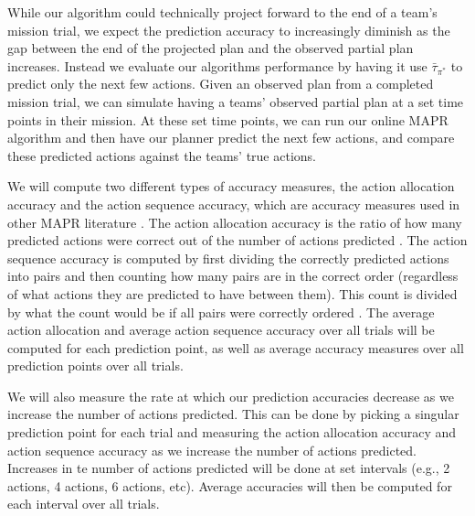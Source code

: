 While our algorithm could technically project forward to the end of a team's mission trial, we expect the prediction accuracy to increasingly diminish as the gap between the end of the projected plan and the observed partial plan increases. Instead we evaluate our algorithms performance by having it use $\bar{\tau}_{\pi^*}$ to predict only the next few actions. Given an observed plan from a completed mission trial, we can simulate having a teams' observed partial plan at a set time points in their mission. At these set time points, we can run our online MAPR algorithm and then have our planner predict the next few actions, and compare these predicted actions against the teams' true actions. 

We will compute two different types of accuracy measures, the action allocation accuracy and the action sequence accuracy, which are accuracy measures used in other MAPR literature \citep{Kim_Chacha_Shah_2015}. The action allocation accuracy is the ratio of how many predicted actions were correct out of the number of actions predicted \citep{Kim_Chacha_Shah_2015}. The action sequence accuracy is computed by first dividing the correctly predicted actions into pairs and then counting how many pairs are in the correct order (regardless of what actions they are predicted to have between them). This count is divided by what the count would be if all pairs were correctly ordered \citep{Kim_Chacha_Shah_2015}. The average action allocation and average action sequence accuracy over all trials will be computed for each prediction point, as well as average accuracy measures over all prediction points over all trials. 

We will also measure the rate at which our prediction accuracies decrease as we increase the number of actions predicted. This can be done by picking a singular prediction point for each trial and measuring the action allocation accuracy and action sequence accuracy as we increase the number of actions predicted. Increases in te number of actions predicted will be done at set intervals (e.g., 2 actions, 4 actions, 6 actions, etc).  Average accuracies will then be computed for each interval over all trials. 
